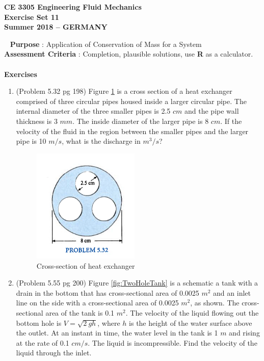 \documentclass[12pt]{article}
\begin{document}
\begingroup
\begin{center}
{\textbf{{ CE 3305 Engineering Fluid Mechanics} \\ Exercise Set 11 \\ Summer 2018 -- GERMANY} }
\end{center}
\endgroup
\begingroup
~\newline
\textbf{Purpose} :  Application of Conservation of Mass for a System \\
\textbf{Assessment Criteria} : Completion, plausible solutions, use \textbf{R} as a calculator. \\~\\
\textbf{Exercises}

\begin{enumerate}
\item (Problem 5.32 pg 198)  Figure \ref{fig:HeatExchange} is a cross section of a heat exchanger comprised of three circular pipes housed inside a larger circular pipe.  
The internal diameter of the three smaller pipes is 2.5 $cm$ and the pipe wall thickness is 3 $mm$.  The inside diameter of the larger pipe is 8 $cm$.  If the velocity of the fluid in the region between the smaller pipes and the larger pipe is 10 $m/s$, what is the discharge in $m^3/s$?  

\begin{figure}[h!] %
   \centering
   \includegraphics[width=2in]{HeatExchange.jpg} 
   \caption{Cross-section of heat exchanger}
   \label{fig:HeatExchange}
\end{figure}

\clearpage
\item (Problem 5.55 pg 200) Figure \ref{fig:TwoHoleTank} is a schematic a tank with a drain in the bottom that has cross-sectional area of 0.0025 $m^2$ and an inlet line on the side with a cross-sectional area of 0.0025 $m^2$, as shown.  
The cross-sectional area of the tank is 0.1 $m^2$.  
The velocity of the liquid flowing out the bottom hole is $V = \sqrt{2~gh}$, where $h$ is the height of the water surface above the outlet.
At an instant in time, the water level in the tank is 1 $m$ and rising at the rate of 0.1 $cm/s$.  
The liquid is incompressible.
Find the velocity of the liquid through the inlet.


\end{enumerate}
\end{document}
